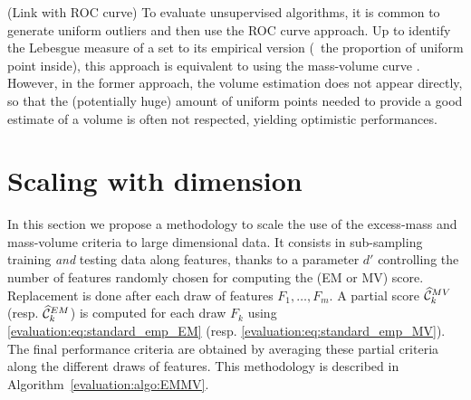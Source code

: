 \begin{remark}({\sc Link with ROC curve})
To evaluate unsupervised algorithms, it is common to generate uniform outliers and then use the ROC curve approach. Up to identify the Lebesgue measure of a set to its empirical version (\ie~the proportion of uniform point inside),
this approach is equivalent to using the mass-volume curve \citep{CLEM14}.
 However, in the former approach, the volume estimation does not appear directly, so that the (potentially huge) amount of uniform points needed to provide a good estimate of a volume is often not respected, yielding optimistic performances.
\end{remark}
\section{Scaling with dimension}
\label{evaluation:scaling-dim}
In this section we propose a methodology to scale the use of the excess-mass and mass-volume criteria to large dimensional data. It consists in sub-sampling training \emph{and} testing data along features, thanks to a parameter $d'$ controlling the number of features randomly chosen for computing the (EM or MV) score. Replacement is done after each draw of features $F_1,\ldots,F_{m}$. A partial score $\widehat {\mathcal{C}}_k^{MV}$ (resp. $\widehat {\mathcal{C}}_k^{EM}$) is computed for each draw $F_k$ using \eqref{evaluation:eq:standard_emp_EM} (resp. \eqref{evaluation:eq:standard_emp_MV}). The final performance criteria are obtained by averaging these partial criteria along the different draws of features. This methodology is described in Algorithm~\ref{evaluation:algo:EMMV}.
%
%

